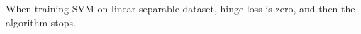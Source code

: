 \begin{answer}
	When training SVM on linear separable dataset, hinge loss is zero, and then the algorithm stops.
\end{answer}
